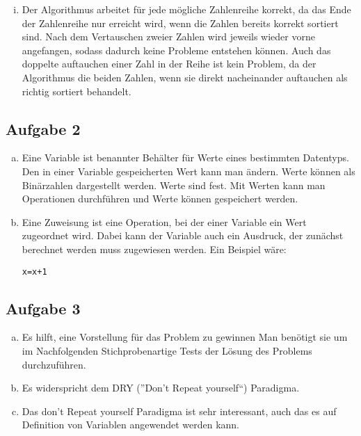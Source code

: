 \documentclass[11pt]{article}
\begin{document}
\begin{enumerate}[i)]
\item Der Algorithmus arbeitet f\"ur jede m\"ogliche Zahlenreihe korrekt, da das Ende der Zahlenreihe nur erreicht wird, wenn die Zahlen bereits korrekt sortiert sind. Nach dem Vertauschen zweier Zahlen wird jeweils wieder vorne angefangen, sodass dadurch keine Probleme entstehen k\"onnen. Auch das doppelte auftauchen einer Zahl in der Reihe ist kein Problem, da der Algorithmus die beiden Zahlen, wenn sie direkt nacheinander auftauchen als richtig sortiert behandelt.
\end{enumerate}

\subsection*{Aufgabe 2}
\begin{enumerate}[a)]

\item Eine Variable ist benannter Beh\"alter f\"ur Werte eines bestimmten Datentyps. Den in einer Variable gespeicherten Wert kann man \"andern. Werte k\"onnen als Bin\"arzahlen dargestellt werden. Werte sind fest. Mit Werten kann man Operationen durchf\"uhren und Werte k\"onnen gespeichert werden.

\item Eine Zuweisung ist eine Operation, bei der einer Variable ein Wert zugeordnet wird. Dabei kann der Variable auch ein Ausdruck, der zun\"achst  berechnet werden muss zugewiesen werden. Ein Beispiel w\"are:
\begin{lstlisting}
x=x+1
\end{lstlisting}

\end{enumerate}
\subsection*{Aufgabe 3}
\begin{enumerate}[a)]
  \item Es hilft, eine Vorstellung f\"ur das Problem zu gewinnen
    Man ben\"otigt sie um im Nachfolgenden Stichprobenartige Tests
    der L\"osung des Problems durchzuf\"uhren.
  \item
    Es widerspricht dem DRY (''Don't Repeat yourself``) Paradigma.
  \item
    Das don't Repeat yourself Paradigma ist sehr interessant, auch das es auf
    Definition von Variablen angewendet werden kann.
\end{enumerate}
\end{document}
